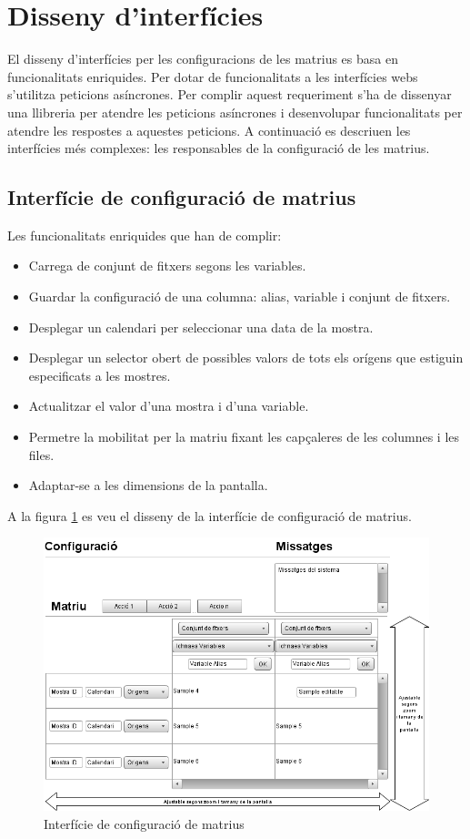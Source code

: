 \section{Disseny d'interf\'{i}cies}
El disseny d'interfícies per les configuracions de les matrius es basa en funcionalitats enriquides\cite{ria}. Per dotar de funcionalitats a les interfícies webs s'utilitza peticions asíncrones. Per complir aquest requeriment s'ha de dissenyar una llibreria per atendre les peticions asíncrones i desenvolupar funcionalitats per atendre les respostes a aquestes peticions. A continuaci\'{o} es descriuen les interf\'{i}cies m\'{e}s complexes: les responsables de la configuraci\'{o} de les matrius.


\subsection{Interf\'{i}cie de configuraci\'{o} de matrius}
Les funcionalitats enriquides que han de complir:
\begin{itemize}
\item Carrega de conjunt de fitxers segons les variables.
\item Guardar la configuració de una columna: alias, variable i conjunt de fitxers.
\item Desplegar un calendari per seleccionar una data de la mostra.
\item Desplegar un selector obert de possibles valors de tots els orígens que estiguin especificats a les mostres.
\item Actualitzar el valor d'una mostra i d'una variable.
\item Permetre la mobilitat per la matriu fixant les capçaleres de les columnes i les files.
\item Adaptar-se a les dimensions de la pantalla.
\end{itemize}

A la figura \ref{fig:interfacematrixconf} es veu el disseny de la interfície de configuraci\'{o} de matrius.

\begin{figure}[H]
  \includegraphics[scale=0.6]{img/design/Interficiedeconfiguracio.png}
  \caption{Interfície de configuració de matrius}
  \label{fig:interfacematrixconf}
\end{figure}


